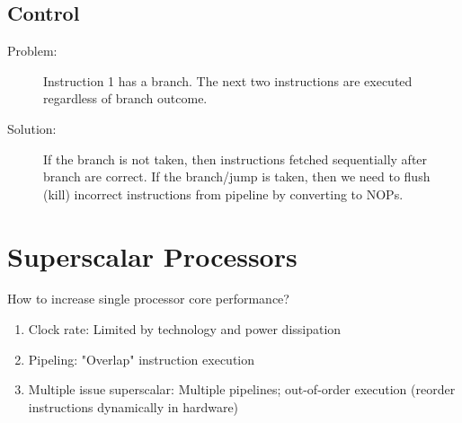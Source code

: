 \subsection{Control}
\begin{description}
	\item[Problem:] Instruction 1 has a branch. The next two instructions are executed regardless of branch outcome.
	\item[Solution:] If the branch is not taken, then instructions fetched sequentially after branch are correct. If the branch/jump is taken, then we need to flush (kill) incorrect instructions from pipeline by converting to NOPs.
\end{description}

\section{Superscalar Processors}
How to increase single processor core performance?
\begin{enumerate}
    \item Clock rate: Limited by technology and power dissipation
    \item Pipeling: "Overlap" instruction execution
    \item Multiple issue superscalar: Multiple pipelines; out-of-order execution (reorder instructions dynamically in hardware)
\end{enumerate}